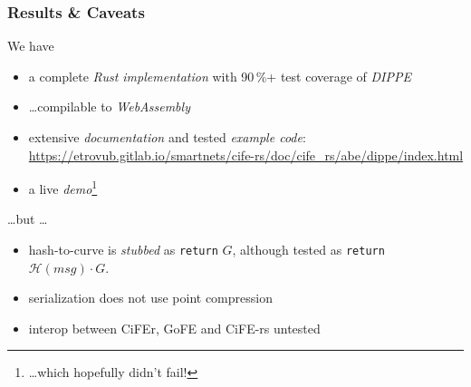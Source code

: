 \documentclass[aspectratio=169]{beamer}
\begin{document}
\begin{frame}
  \frametitle{Results \& Caveats}

  We have
  \begin{itemize}
    \item a complete \emph{Rust implementation} with 90\,\%+ test coverage of \emph{DIPPE}
    \item \dots compilable to \emph{WebAssembly}
    \item extensive \emph{documentation} and tested \emph{example code}:\\
      \url{https://etrovub.gitlab.io/smartnets/cife-rs/doc/cife_rs/abe/dippe/index.html}
    \item a live \emph{demo}\footnote{\dots which hopefully didn't fail!}
  \end{itemize}

  \medbreak

  \dots but \dots

  \medbreak

  \begin{itemize}
    \item hash-to-curve is \emph{stubbed} as \texttt{return} \(G\),
      although tested as \texttt{return} \(\mathcal{H}(msg) \cdot G\).
    \item serialization does not use point compression
    \item interop between CiFEr, GoFE and CiFE-rs untested
  \end{itemize}
\end{frame}
\end{document}
